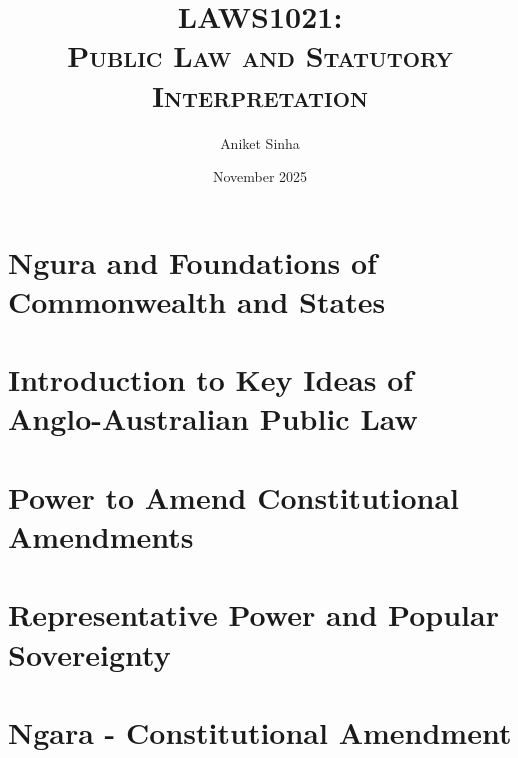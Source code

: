 \documentclass[12pt]{book}
\title{\Huge\bfseries\scshape LAWS1021: \\ Public Law and Statutory Interpretation}
\author{Aniket Sinha}
\date{November 2025}
\begin{document}
\maketitle

\frontmatter

\tableofcontents

\renewcommand{\numberline}[1]{#1\hspace{1em}} %




\flushleft

\mainmatter

\chapter{Ngura and Foundations of Commonwealth and States}


\chapter{Introduction to Key Ideas of Anglo-Australian Public Law}


\chapter{Power to Amend Constitutional Amendments}


\chapter{Representative Power and Popular Sovereignty}


\chapter{Ngara - Constitutional Amendment}

\end{document}

